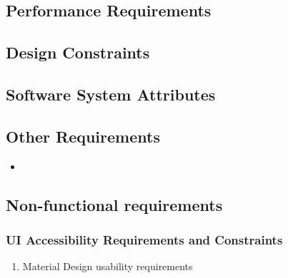 \documentclass[12pt]{article}
\begin{document}
{{        \subsection{Performance Requirements}


        \subsection{Design Constraints}


        \subsection{Software System Attributes}


        \subsection{Other Requirements}
			\begin{itemize}
  				\item
			\end{itemize}
	\subsection{Non-functional requirements}
    \subsubsection{UI Accessibility Requirements and Constraints}
     \begin{enumerate}
   \item Material Design usability requirements


\end{enumerate}}}
\end{document}
